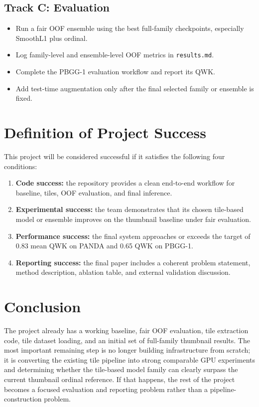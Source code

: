 \documentclass[11pt]{article}
\begin{document}
\subsection{Track C: Evaluation}

\begin{itemize}[leftmargin=*]
    \item Run a fair OOF ensemble using the best full-family checkpoints, especially SmoothL1 plus ordinal.
    \item Log family-level and ensemble-level OOF metrics in \texttt{results.md}.
    \item Complete the PBGG-1 evaluation workflow and report its QWK.
    \item Add test-time augmentation only after the final selected family or ensemble is fixed.
\end{itemize}

\section{Definition of Project Success}

This project will be considered successful if it satisfies the following four conditions:

\begin{enumerate}[leftmargin=*]
    \item \textbf{Code success:} the repository provides a clean end-to-end workflow for baseline, tiles, OOF evaluation, and final inference.
    \item \textbf{Experimental success:} the team demonstrates that its chosen tile-based model or ensemble improves on the thumbnail baseline under fair evaluation.
    \item \textbf{Performance success:} the final system approaches or exceeds the target of 0.83 mean QWK on PANDA and 0.65 QWK on PBGG-1.
    \item \textbf{Reporting success:} the final paper includes a coherent problem statement, method description, ablation table, and external validation discussion.
\end{enumerate}

\section{Conclusion}

The project already has a working baseline, fair OOF evaluation, tile extraction code, tile dataset loading, and an initial set of full-family thumbnail results. The most important remaining step is no longer building infrastructure from scratch; it is converting the existing tile pipeline into strong comparable GPU experiments and determining whether the tile-based model family can clearly surpass the current thumbnail ordinal reference. If that happens, the rest of the project becomes a focused evaluation and reporting problem rather than a pipeline-construction problem.
\end{document}
